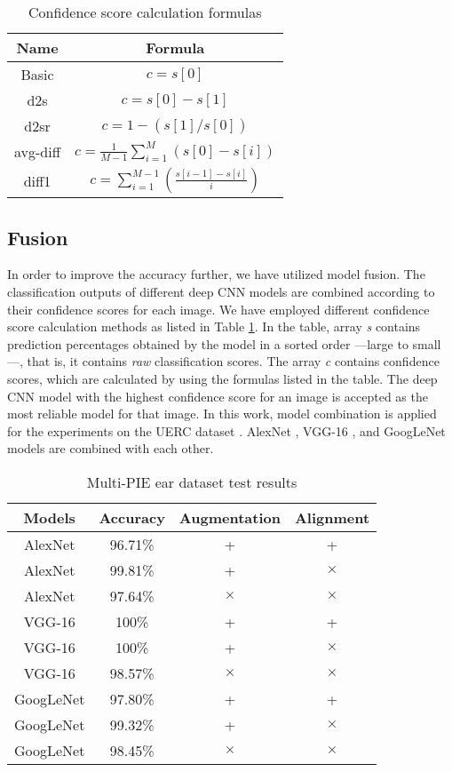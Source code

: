 \documentclass[11pt,journal,compsoc]{IEEEtran}
\begin{document}
\begin{table}[!b]
\renewcommand{\arraystretch}{1.3}
\caption{Confidence score calculation formulas}
\label{tab_fusion_method}
\centering
\begin{tabular}{|c|c|}
\hline
Name  & Formula \\
\hline
Basic & $c = s[0]$ \\
\hline
d2s & $c = s[0] - s[1]$ \\
\hline
d2sr & $c = 1 - (s[1]/s[0])$ \\
\hline
avg-diff & $c = \frac{1}{M-1} \sum_{i=1}^M (s[0] - s[i])$ \\
\hline
diff1 & $c = \sum_{i=1}^{M-1} (\frac{s[i-1] - s[i]}{i})$ \\
\hline
\end{tabular}
\end{table}

\subsection{Fusion}\label{subsec2.8}

In order to improve the accuracy further, we have utilized model fusion. The classification outputs of different deep CNN models are combined according to their confidence scores for each image. We have employed different confidence score calculation methods as listed in Table \ref{tab_fusion_method}. In the table, array \textit{s} contains prediction percentages obtained by the model in a sorted order ---large to small---, that is, it contains \textit{raw} classification scores. The array \textit{c} contains confidence scores, which are calculated by using the formulas listed in the table. The deep CNN model with the highest confidence score for an image is accepted as the most reliable model for that image. 
In this work, model combination is applied for the experiments on the UERC dataset \cite{Emersic_2017_b}. AlexNet \cite{Krizhevsky_2012}, VGG-16 \cite{Simonyan_2014}, and GoogLeNet \cite{Szegedy_2015} models are combined with each other.

\begin{table}[t]
\renewcommand{\arraystretch}{1.3}
\caption{Multi-PIE ear dataset test results}
\label{Multi-Pie}
\centering
\begin{tabular}{|c|c|c|c|}
\hline
Models & Accuracy & Augmentation & Alignment\\
\hline
AlexNet & 96.71\% & + & + \\
\hline
AlexNet & 99.81\% & + & $\times$ \\
\hline
AlexNet & 97.64\% & $\times$ & $\times$ \\
\hline
VGG-16 & 100\% & + & + \\
\hline
VGG-16 & 100\% & + & $\times$ \\
\hline
VGG-16 & 98.57\% & $\times$ & $\times$ \\
\hline
GoogLeNet & 97.80\% & + & + \\
\hline
GoogLeNet & 99.32\% & + & $\times$ \\
\hline
GoogLeNet & 98.45\% & $\times$ & $\times$ \\
\hline
\end{tabular}
\end{table}
\end{document}
